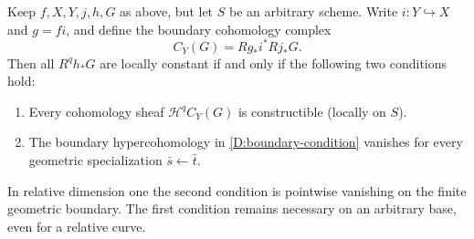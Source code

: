 \begin{proposition}
\label{D:boundary-arbitrary}
Keep $f,X,Y,j,h,G$ as above, but let $S$ be an arbitrary scheme.
Write $i:Y\hookrightarrow X$ and $g=f i$, and define the boundary
cohomology complex
\[
 C_Y(G)=Rg_*i^*Rj_*G.
\]
Then all $R^q h_*G$ are locally constant if and only if the following
two conditions hold:
\begin{enumerate}
\item Every cohomology sheaf $\mathcal H^q C_Y(G)$ is constructible
(locally on $S$).
\item The boundary hypercohomology in
\eqref{D:boundary-condition} vanishes for every geometric
specialization $\bar s\leftarrow\bar t$.
\end{enumerate}
In relative dimension one the second condition is pointwise vanishing
on the finite geometric boundary. The first condition remains necessary
on an arbitrary base, even for a relative curve.
\end{proposition}
